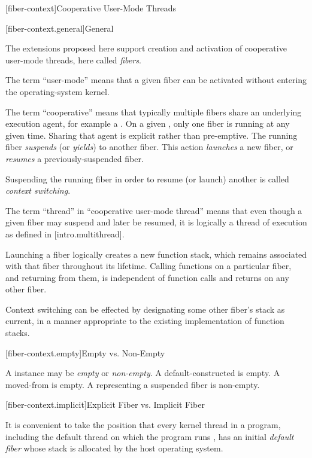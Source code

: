 \newpage

\setcounter{section}{33}
\setcounter{subsection}{6}

\label{api}

[fiber-context]{Cooperative User-Mode Threads}

[fiber-context.general]{General}

The extensions proposed here support creation and activation of cooperative
user-mode threads, here called \emph{fibers}.

The term ``user-mode'' means that a given fiber can be activated without
entering the operating-system kernel.

The term ``cooperative'' means that typically multiple fibers share an
underlying execution agent, for example a . On a
given , only one fiber is running at any given time. Sharing
that agent is explicit rather than pre-emptive. The running
fiber \emph{suspends} (or \emph{yields}) to another fiber. This
action \emph{launches} a new fiber, or \emph{resumes} a previously-suspended
fiber.

Suspending the running fiber in order to resume (or launch) another is
called \emph{context switching}.

The term ``thread'' in ``cooperative user-mode thread'' means that even
though a given fiber may suspend and later be resumed, it is logically a
thread of execution as defined in [intro.multithread].

Launching a fiber logically creates a new function stack, which remains
associated with that fiber throughout its lifetime. Calling functions on a
particular fiber, and returning from them, is independent of function calls
and returns on any other fiber.

Context switching can be effected by designating some other fiber's stack as
current, in a manner appropriate to the existing implementation of function stacks.

[fiber-context.empty]{Empty vs. Non-Empty}

A \fiber instance may be \emph{empty} or \emph{non-empty}. A
default-constructed \fiber is empty. A moved-from \fiber is empty. A \fiber
representing a suspended fiber is non-empty.

[fiber-context.implicit]{Explicit Fiber vs. Implicit Fiber}

It is convenient to take the position that every kernel thread in a program,
including the default thread on which the program runs \main, has an initial
\emph{default fiber} whose stack is allocated by the host operating system. 

